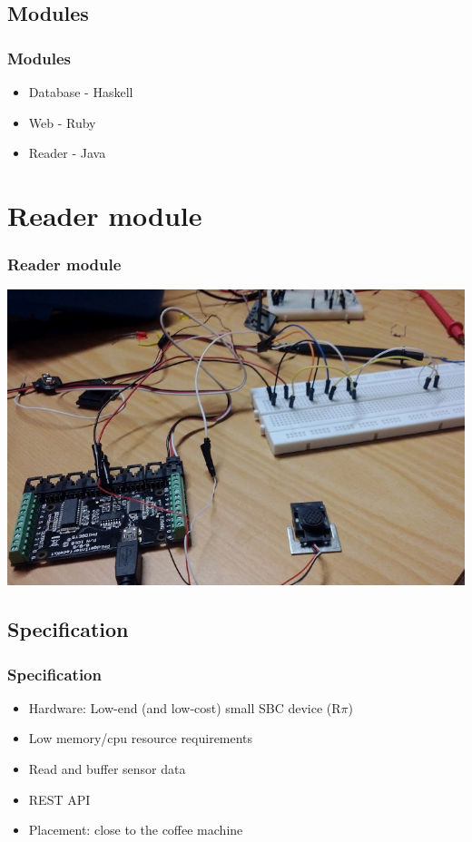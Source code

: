 \documentclass{beamer}
\begin{document}
\subsection{Modules}
\begin{frame}
    \frametitle{Modules}
    \begin{itemize}
        \item Database - Haskell
        \item Web - Ruby
        \item Reader - Java
    \end{itemize}
\end{frame}

\section{Reader module}
\begin{frame}
    \frametitle{Reader module}
    \includegraphics[scale=0.46]{images/wsensor.png}
\end{frame}
\subsection{Specification}
\begin{frame}
    \frametitle{Specification}
    \begin{itemize}
        \item Hardware: Low-end (and low-cost) small SBC device (R$\pi$)
        \item Low memory/cpu resource requirements
        \item Read and buffer sensor data
        \item REST API
        \item Placement: close to the coffee machine
    \end{itemize}
\end{frame}
\end{document}
